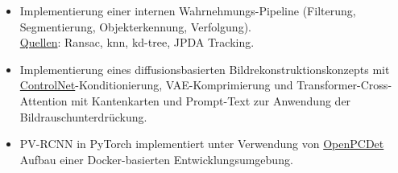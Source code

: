\begin{itemize}[leftmargin=*]
  \item Implementierung einer internen Wahrnehmungs-Pipeline (Filterung, Segmentierung, Objekterkennung, Verfolgung).\\ {\fontsize{10pt}{10pt}\selectfont\textcolor{blocktext2_color}{{\fontsize{10pt}{10pt}\selectfont\textcolor{blocktext2_color}{\href{https://amr-aboughazala.super.site/perception}{Quellen}}}: Ransac, knn, kd-tree, JPDA Tracking}}.
  
  \vspace{0.2em}
  
  \item Implementierung eines diffusionsbasierten Bildrekonstruktionskonzepts mit {\fontsize{10pt}{10pt}\selectfont\textcolor{blocktext2_color}{{\fontsize{10pt}{10pt}\selectfont\textcolor{blocktext2_color}{\href{https://github.com/lllyasviel/ControlNet}{ControlNet}}}}}-Konditionierung, VAE-Komprimierung und Transformer-Cross-Attention mit Kantenkarten und Prompt-Text zur Anwendung der Bildrauschunterdrückung.

  
  \vspace{0.2em}
  
  \item PV-RCNN in PyTorch implementiert unter Verwendung von {\fontsize{10pt}{10pt}\selectfont\textcolor{blocktext2_color}{{\fontsize{10pt}{10pt}\selectfont\textcolor{blocktext2_color}{\href{https://github.com/open-mmlab/OpenPCDet}{OpenPCDet}}}}} Aufbau einer Docker-basierten Entwicklungsumgebung.   

\end{itemize}
